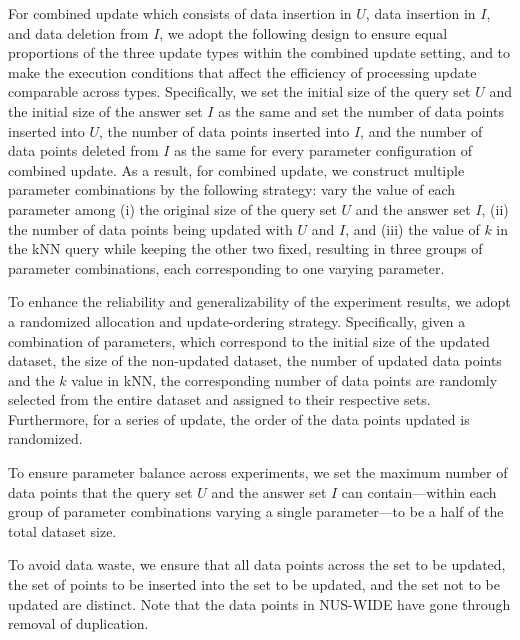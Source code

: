 For combined update which consists of data insertion in $U$, data insertion in $I$, and data deletion from $I$, we adopt the following design to ensure equal proportions of the three update types within the combined update setting, and to make the execution conditions that affect the efficiency of processing update comparable across types. Specifically, we set the initial size of the query set $U$ and the initial size of the answer set $I$ as the same and set the number of data points inserted into $U$, the number of data points inserted into $I$, and the number of data points deleted from $I$ as the same for every parameter configuration of combined update. As a result, for combined update, we construct multiple parameter combinations by the following strategy: vary the value of each parameter among (i) the original size of the query set $U$ and the answer set $I$, (ii) the number of data points being updated with $U$ and $I$, and (iii) the value of $k$ in the kNN query while keeping the other two fixed, resulting in three groups of parameter combinations, each corresponding to one varying parameter.


To enhance the reliability and generalizability of the experiment results, we adopt a randomized allocation and update-ordering strategy. Specifically, given a combination of parameters, which correspond to the initial size of the updated dataset, the size of the non-updated dataset, the number of updated data points and the $k$ value in kNN, the corresponding number of data points are randomly selected from the entire dataset and assigned to their respective sets. Furthermore, for a series of update, the order of the data points updated is randomized.


To ensure parameter balance across experiments, we set the maximum number of data points that the query set $U$ and the answer set $I$ can contain—within each group of parameter combinations varying a single parameter—to be a half of the total dataset size.


To avoid data waste, we ensure that all data points across the set to be updated, the set of points to be inserted into the set to be updated, and the set not to be updated are distinct. Note that the data points in NUS-WIDE have gone through removal of duplication.

